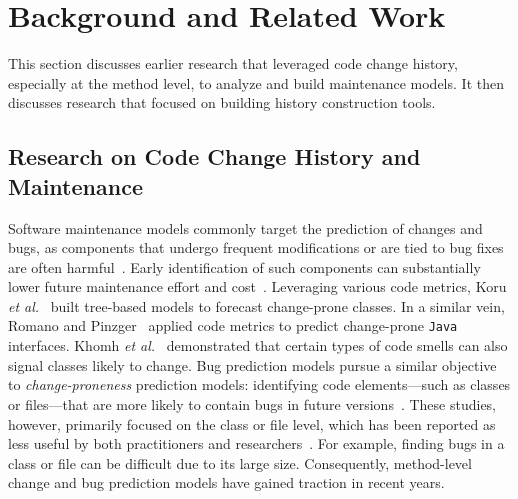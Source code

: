 \section{Background and Related Work}
This section discusses earlier research that leveraged code change history, especially at the method level, to analyze and build maintenance models. It then discusses research that focused on building history construction tools.
\subsection{Research on Code Change History and Maintenance}
Software maintenance models commonly target the prediction of changes and bugs, as components that undergo frequent modifications or are tied to bug fixes are often harmful~\cite{chowdhury_good_2025, arvanitou_method_2017, di_grazia_code_2023,opu2025llm}. Early identification of such components can substantially lower future maintenance effort and cost~\cite{gunes_koru_identifying_2007, abbas_software_2020, chowdhury_good_2025, chowdhury_empirical_2022}. Leveraging various code metrics, Koru \textit{et al.}~\cite{gunes_koru_identifying_2007} built tree-based models to forecast change-prone classes. In a similar vein, Romano and Pinzger~\cite{romano_using_2011} applied code metrics to predict change-prone \texttt{Java} interfaces. Khomh \textit{et al.}~\cite{khomh_exploratory_2009} demonstrated that certain types of code smells can also signal classes likely to change. Bug prediction models pursue a similar objective to \textit{change-proneness} prediction models: identifying code elements—such as classes or files—that are more likely to contain bugs in future versions~\cite{aleithan_explainable_2021, alsolai_predicting_2018, basili_validation_1996, gil_correlation_2017, zimmermann_predicting_2007, kamei_defect_2016}. These studies, however, primarily focused on the class or file level, which has been reported as less useful by both practitioners and researchers~\cite{grund_codeshovel_2021, pascarella_performance_2020, giger_method-level_2012, chowdhury_method-level_2024}. For example, finding bugs in a class or file can be difficult due to its large size. Consequently, method-level change and bug prediction models have gained traction in recent years.

